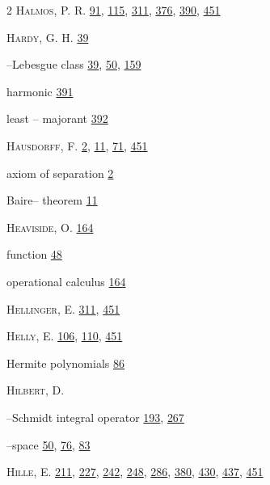 \begin{multicols}{2}
\noindent \textsc{Halmos}, P. R. \hyperlink{page.91}{91}, \hyperlink{page.115}{115}, \hyperlink{page.311}{311}, \hyperlink{page.376}{376}, \hyperlink{page.390}{390}, \hyperlink{page.451}{451}\par
\noindent \textsc{Hardy}, G. H. \hyperlink{page.39}{39}\par
\hspace*{1.1em}--Lebesgue class \hyperlink{page.39}{39}, \hyperlink{page.50}{50}, \hyperlink{page.159}{159}\par
\noindent harmonic \hyperlink{page.391}{391}\par
\hspace*{1.1em}least -- majorant \hyperlink{page.392}{392}\par
\noindent \textsc{Hausdorff}, F. \hyperlink{page.2}{2}, \hyperlink{page.11}{11}, \hyperlink{page.71}{71}, \hyperlink{page.451}{451}\par
\hspace*{1.1em}axiom of separation \hyperlink{page.2}{2}\par
\hspace*{1.1em}Baire-- theorem \hyperlink{page.11}{11}\par
\noindent \textsc{Heaviside}, O. \hyperlink{page.164}{164}\par
\hspace*{1.1em}function \hyperlink{page.48}{48}\par
\hspace*{1.1em}operational calculus \hyperlink{page.164}{164}\par
\noindent \textsc{Hellinger}, E. \hyperlink{page.311}{311}, \hyperlink{page.451}{451}\par
\noindent \textsc{Helly}, E. \hyperlink{page.106}{106}, \hyperlink{page.110}{110}, \hyperlink{page.451}{451}\par
\noindent Hermite polynomials \hyperlink{page.86}{86}\par
\noindent \textsc{Hilbert}, D.\par
\hspace*{1.1em}--Schmidt integral operator \hyperlink{page.193}{193}, \hyperlink{page.267}{267}\par
\hspace*{1.1em}--space \hyperlink{page.50}{50}, \hyperlink{page.76}{76}, \hyperlink{page.83}{83}\par
\noindent \textsc{Hille}, E. \hyperlink{page.211}{211}, \hyperlink{page.227}{227}, \hyperlink{page.242}{242}, \hyperlink{page.248}{248}, \hyperlink{page.286}{286}, \hyperlink{page.380}{380}, \hyperlink{page.430}{430}, \hyperlink{page.437}{437}, \hyperlink{page.451}{451}\par

\end{multicols}

